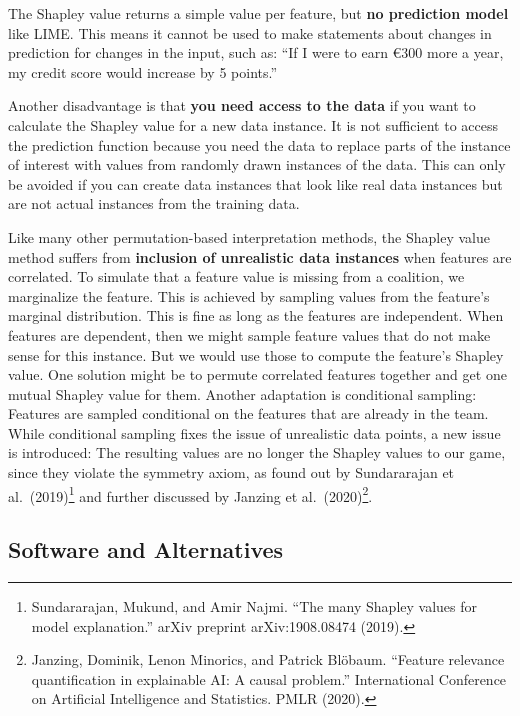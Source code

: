 \documentclass[
  10pt,
]{scrbook}
\begin{document}
The Shapley value returns a simple value per feature, but \textbf{no prediction model} like LIME.
This means it cannot be used to make statements about changes in prediction for changes in the input, such as:
``If I were to earn €300 more a year, my credit score would increase by 5 points.''

Another disadvantage is that \textbf{you need access to the data} if you want to calculate the Shapley value for a new data instance.
It is not sufficient to access the prediction function because you need the data to replace parts of the instance of interest with values from randomly drawn instances of the data.
This can only be avoided if you can create data instances that look like real data instances but are not actual instances from the training data.

Like many other permutation-based interpretation methods, the Shapley value method suffers from \textbf{inclusion of unrealistic data instances} when features are correlated.
To simulate that a feature value is missing from a coalition, we marginalize the feature.
This is achieved by sampling values from the feature's marginal distribution.
This is fine as long as the features are independent.
When features are dependent, then we might sample feature values that do not make sense for this instance.
But we would use those to compute the feature's Shapley value.
One solution might be to permute correlated features together and get one mutual Shapley value for them.
Another adaptation is conditional sampling: Features are sampled conditional on the features that are already in the team.
While conditional sampling fixes the issue of unrealistic data points, a new issue is introduced:
The resulting values are no longer the Shapley values to our game, since they violate the symmetry axiom, as found out by Sundararajan et al.~(2019)\footnote{Sundararajan, Mukund, and Amir Najmi. ``The many Shapley values for model explanation.'' arXiv preprint arXiv:1908.08474 (2019).} and further discussed by Janzing et al.~(2020)\footnote{Janzing, Dominik, Lenon Minorics, and Patrick Blöbaum. ``Feature relevance quantification in explainable AI: A causal problem.'' International Conference on Artificial Intelligence and Statistics. PMLR (2020).}.

\hypertarget{software-and-alternatives-4}{%
\subsection{Software and Alternatives}\label{software-and-alternatives-4}}
\end{document}
